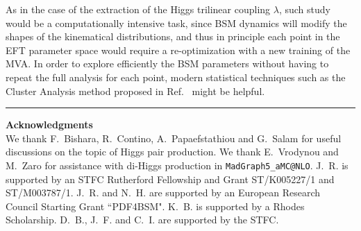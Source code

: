 As in the case of the extraction of the Higgs
trilinear coupling $\lambda$, such study
would be a computationally intensive task, since
BSM dynamics will modify the shapes of the kinematical
distributions, and thus in principle each point in the EFT parameter
space would require a re-optimization with a new training
of the MVA.
%
In order to explore efficiently the BSM parameters
without having to repeat the full analysis
for each point, modern statistical techniques
such as the Cluster Analysis method proposed
in Ref.~\cite{Dall'Osso:2015aia} might be helpful.



\bigskip
\bigskip
\begin{center}
\rule{5cm}{.1pt}
\end{center}
\bigskip
\bigskip

{\bf\noindent  Acknowledgments \\}
We thank F.~Bishara, R.~Contino, A.~Papaefstathiou and
G.~Salam for useful discussions on the topic
of Higgs pair production.
%
We thank E.~Vrodynou and M.~Zaro for
assistance with di-Higgs production
  in {\tt MadGraph5\_aMC@NLO}.
%
  J.~R. is supported by an STFC Rutherford Fellowship and
  Grant ST/K005227/1 and ST/M003787/1.
%
J.~R. and N.~H. are
supported by an European Research Council Starting Grant ``PDF4BSM".
%
K.~B. is supported by a Rhodes Scholarship.
%
D.~B., J.~F. and C.~I. are supported by the STFC.
